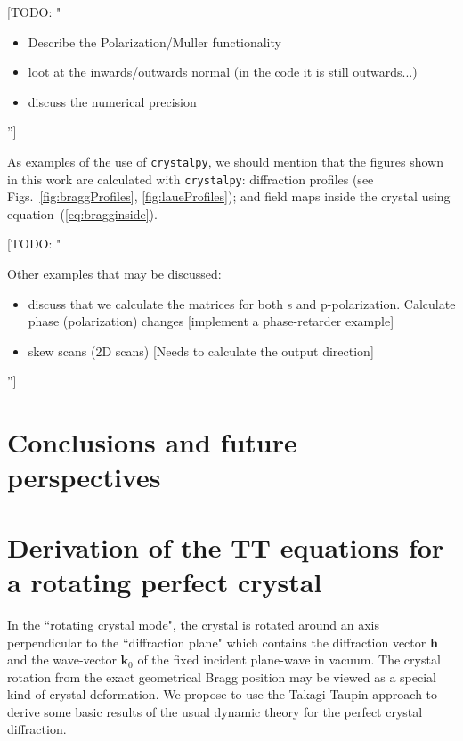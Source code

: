 \documentclass[preprint]{iucr}              %
\newcommand{\todo}[1]{{\color{red}[TODO: "#1'']}}
\begin{document}
\todo{ 
\begin{itemize}
    \item Describe the Polarization/Muller functionality
    \item loot at the inwards/outwards normal (in the code it is still outwards...)
    \item discuss the numerical precision 
\end{itemize}
}

As examples of the use of {\tt crystalpy}, we should mention that the figures shown in this work are calculated with {\tt crystalpy}: diffraction profiles (see Figs.~\ref{fig:braggProfiles}, \ref{fig:laueProfiles}); and field maps inside the crystal using equation~(\ref{eq:bragginside}). 


\todo{ 

Other examples that may be discussed: 
\begin{itemize}
    \item discuss that we calculate the matrices for both s and p-polarization. Calculate phase (polarization) changes [implement a phase-retarder example]
    \item skew scans (2D scans) [Needs to calculate the output direction]
\end{itemize}
}



\section{Conclusions and future perspectives}
\label{sec:summary}







\appendix

\section{Derivation of the TT equations for a rotating perfect crystal}
\label{appendix:rotating}

In the ``rotating crystal mode", the crystal is rotated around an axis perpendicular to the ``diffraction plane" which contains the diffraction vector $\textbf{h}$ and the wave-vector $\textbf{k}_0$ of the fixed incident plane-wave in vacuum. The crystal rotation from the exact geometrical Bragg position may be viewed as a special kind of crystal deformation. We propose to use the Takagi-Taupin approach to derive some basic results of the usual dynamic theory for the perfect crystal diffraction. 
\end{document}

